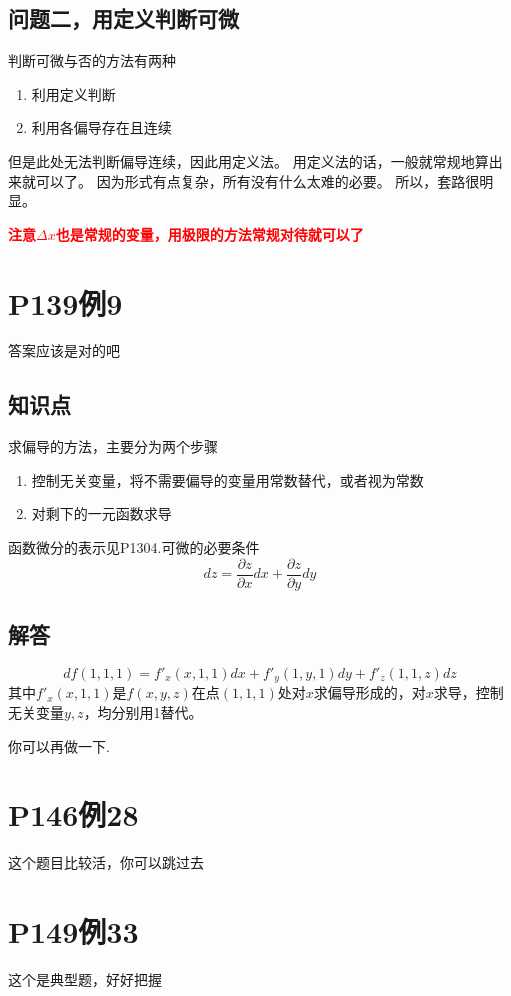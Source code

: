 \documentclass[a4paper]{ctexart}
\begin{document}
\begin{multicols}{2}
\subsection{问题二，用定义判断可微}
\par 判断可微与否的方法有两种
\begin{enumerate}
    \item 利用定义判断
    \item 利用各偏导存在且连续
\end{enumerate}
\par 但是此处无法判断偏导连续，因此用定义法。 用定义法的话，一般就常规地算出来就可以了。 因为形式有点复杂，所有没有什么太难的必要。 所以，套路很明显。
\par \textbf{\textcolor{red} {注意$\Delta x$也是常规的变量，用极限的方法常规对待就可以了}}

\section{P139例9}
答案应该是对的吧
\subsection{知识点}
\par 求偏导的方法，主要分为两个步骤
\begin{enumerate}
    \item 控制无关变量，将不需要偏导的变量用常数替代，或者视为常数
    \item 对剩下的一元函数求导
\end{enumerate}
\par 函数微分的表示见P130\quad 4.可微的必要条件
$$
dz = 
\frac{\partial z}
{\partial x}dx
+
\frac{\partial z}
{\partial y}dy
$$

\subsection{解答}

$$
df(1,1,1) = f'_x(x,1,1)dx + f'_y(1,y,1)dy + f'_z(1,1,z)dz
$$
其中$f'_x(x,1,1)$是$f(x,y,z)$在点$(1,1,1)$处对$x$求偏导形成的，对$x$求导，控制无关变量$y,z$，均分别用1替代。
\par 你可以再做一下.

\section{P146例28}
这个题目比较活，你可以跳过去


\section{P149例33}
这个是典型题，好好把握


\end{multicols}
\end{document}
